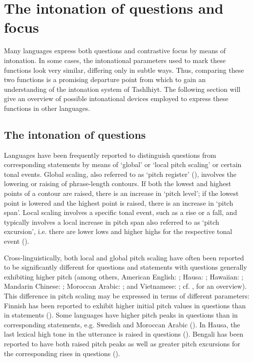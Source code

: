 \section{The intonation of questions and focus}\label{sec:5.3}
Many languages express both questions and contrastive focus by means of intonation. In some cases, the intonational parameters used to mark these functions look very similar, differing only in subtle ways. Thus, comparing these two functions is a promising departure point from which to gain an understanding of the intonation system of Tashlhiyt. The following section will give an overview of possible intonational devices employed to express these functions in other languages. 

\subsection{The intonation of questions}
Languages have been frequently reported to distinguish questions from corresponding statements by means of ‘global’ or ‘local pitch scaling’ or certain tonal events. Global scaling, also referred to as ‘pitch register’ (\citealt{Ladd2008}), involves the lowering or raising of phrase-length contours. If both the lowest and highest points of a contour are raised, there is an increase in ‘pitch level’; if the lowest point is lowered and the highest point is raised, there is an increase in ‘pitch span’. Local scaling involves a specific tonal event, such as a rise or a fall, and typically involves a local increase in pitch span also referred to as ‘pitch excursion’, i.e. there are lower lows and higher highs for the respective tonal event (\citealt{Ladd2008}).

Cross-linguistically, both local and global pitch scaling have often been reported to be significantly different for questions and statements with questions generally exhibiting higher pitch (among others, American English: \citealt{HirstDiCristo1998}; Hausa: \citealt{InkelasLeben1990}; Hawaiian: \citealt{Murphy2013}; Mandarin Chinese: \citealt{Shen1990}; Moroccan Arabic: \citealt{Benkirane1998}; and Vietnamese: \citealt{Brunelle.etal2012}; cf. \citealt{Haan2002}, for an overview). This difference in pitch scaling may be expressed in terms of different parameters: Finnish has been reported to exhibit higher initial pitch values in questions than in statements (\citealt{Iivonen1998}). Some languages have higher pitch peaks in questions than in corresponding statements, e.g. Swedish and Moroccan Arabic (\citealt{HaddingStuddert1964,Garding1983,Benkirane1998}). In Hausa, the last lexical high tone in the utterance is raised in questions (\citealt{InkelasLeben1990}). Bengali has been reported to have both raised pitch peaks as well as greater pitch excursions for the corresponding rises in questions (\citealt{HayesLahiri1991}).

